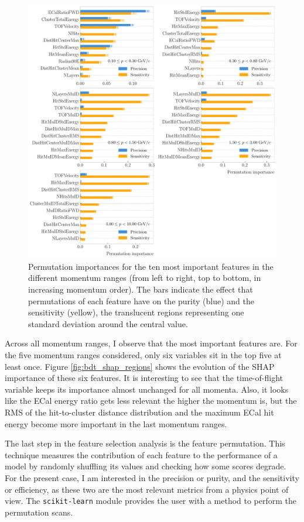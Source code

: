 \begin{figure}[p]
	\centering
	\includegraphics[width=.99\linewidth]{Images/GArSoft_PID/BDT/summary_permutation.pdf}
	\caption{Permutation importances for the ten most important features in the different momentum ranges (from left to right, top to bottom, in increasing momentum order). The bars indicate the effect that permutations of each feature have on the purity (blue) and the sensitivity (yellow), the translucent regions representing one standard deviation around the central value.}
	\label{fig:bdt_permutations}
\end{figure}

Across all momentum ranges, I observe that the most important features are. For the five momentum ranges considered, only six variables sit in the top five at least once. Figure \ref{fig:bdt_shap_regions} shows the evolution of the SHAP importance of these six features. It is interesting to see that the time-of-flight variable keeps its importance almost unchanged for all momenta. Also, it looks like the ECal energy ratio gets less relevant the higher the momentum is, but the RMS of the hit-to-cluster distance distribution and the maximum ECal hit energy become more important in the last momentum ranges.

The last step in the feature selection analysis is the feature permutation. This technique measures the contribution of each feature to the performance of a model by randomly shuffling its values and checking how some scores degrade. For the present case, I am interested in the precision or purity, and the sensitivity or efficiency, as these two are the most relevant metrics from a physics point of view. The \texttt{scikit-learn} module provides the user with a method to perform the permutation scans.

